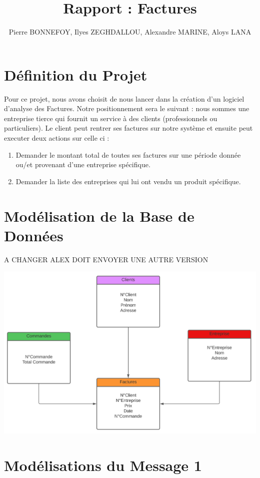 \documentclass[a4paper, 11pt]{article}
\title{Rapport : Factures}
\author{Pierre BONNEFOY, Ilyes ZEGHDALLOU, Alexandre MARINE, Aloys LANA}
\begin{document}
\maketitle

\tableofcontents

\newpage
\section{Définition du Projet}
Pour ce projet, nous avons choisit de nous lancer dans la création d'un logiciel d'analyse des Factures. Notre positionnement sera le suivant : nous sommes une entreprise tierce qui fournit un service à des clients (professionnels ou particuliers). Le client peut rentrer ses factures sur notre système et ensuite peut executer deux actions sur celle ci :
\begin{enumerate}
    \item Demander le montant total de toutes ses factures sur une période donnée ou/et provenant d'une entreprise spécifique.
    \item Demander la liste des entreprises qui lui ont vendu un produit spécifique.
\end{enumerate}

\section{Modélisation de la Base de Données}
A CHANGER ALEX DOIT ENVOYER UNE AUTRE VERSION
    \begin{center}
    \includegraphics[scale=0.3]{schema_bdd.png}
    \end{center}

\section{Modélisations du Message 1}
\end{document}

